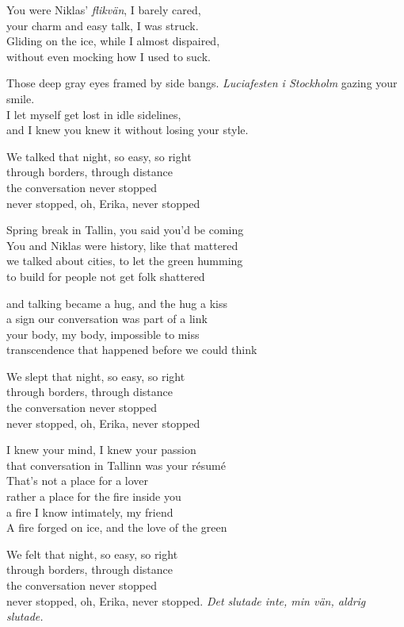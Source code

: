 \begin{lyrics}
You were Niklas' \emph{flikvän}, I barely cared,\\
your charm and easy talk, I was struck.\\
Gliding on the ice, while I almost dispaired,\\
without even mocking how I used to suck.

Those deep gray eyes framed by side bangs.
\emph{Luciafesten i Stockholm} gazing your smile.\\
I let myself get lost in idle sidelines,\\ 
and I knew you knew it without losing your style.

We talked that night, so easy, so right\\
through borders, through distance\\
the conversation never stopped\\
never stopped, oh, Erika, never stopped

Spring break in Tallin, you said you'd be coming\\
You and Niklas were history, like that mattered\\
we talked about cities, to let the green humming\\
to build for people not get folk shattered

and talking became a hug, and the hug a kiss\\
a sign our conversation was part of a link\\
your body, my body, impossible to miss\\
transcendence that happened before we could think

We slept that night, so easy, so right\\
through borders, through distance\\
the conversation never stopped\\
never stopped, oh, Erika, never stopped

I knew your mind, I knew your passion\\
that conversation in Tallinn was your résumé\\
That's not a place for a lover\\
rather a place for the fire inside you\\
a fire I know intimately, my friend\\
A fire forged on ice, and the love of the green

We felt that night, so easy, so right\\
through borders, through distance\\
the conversation never stopped\\
never stopped, oh, Erika, never stopped.
\emph{Det slutade inte, min vän, aldrig slutade.}
\end{lyrics}

